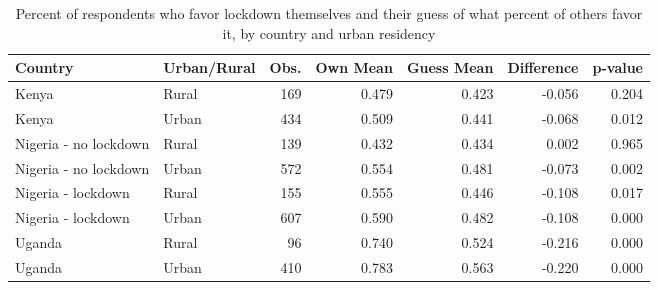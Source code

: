 \begin{table}[ht]
\centering
\caption{Percent of respondents who favor lockdown themselves and their guess of what percent of others favor it, by country and urban residency} 
\label{tab:fig2_urban_rural}
\begin{tabular}{llrrrrr}
  \hline
Country & Urban/Rural & Obs. & Own Mean & Guess Mean & Difference & p-value \\ 
  \hline
Kenya & Rural &  169 & 0.479 & 0.423 & -0.056 & 0.204 \\ 
  Kenya & Urban &  434 & 0.509 & 0.441 & -0.068 & 0.012 \\ 
  Nigeria - no lockdown & Rural &  139 & 0.432 & 0.434 & 0.002 & 0.965 \\ 
  Nigeria - no lockdown & Urban &  572 & 0.554 & 0.481 & -0.073 & 0.002 \\ 
  Nigeria - lockdown & Rural &  155 & 0.555 & 0.446 & -0.108 & 0.017 \\ 
  Nigeria - lockdown & Urban &  607 & 0.590 & 0.482 & -0.108 & 0.000 \\ 
  Uganda & Rural &   96 & 0.740 & 0.524 & -0.216 & 0.000 \\ 
  Uganda & Urban &  410 & 0.783 & 0.563 & -0.220 & 0.000 \\ 
   \hline
\end{tabular}
\end{table}

